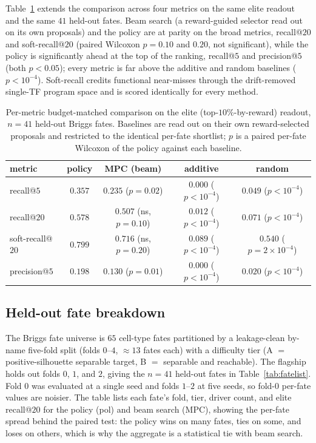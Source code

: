 Table~\ref{tab:elite_permetric} extends the comparison across four metrics on the same elite readout and the same
$41$ held-out fates. Beam search (a reward-guided selector read out on its own proposals) and the policy are at
parity on the broad metrics, recall@$20$ and soft-recall@$20$ (paired Wilcoxon $p{=}0.10$ and $0.20$, not
significant), while the policy is significantly ahead at the top of the ranking, recall@$5$ and precision@$5$
(both $p<0.05$); every metric is far above the additive and random baselines ($p<10^{-4}$). Soft-recall credits
functional near-misses through the drift-removed single-TF program space and is scored identically for every
method.

\begin{table}[h]\centering\footnotesize
\caption{Per-metric budget-matched comparison on the elite (top-$10\%$-by-reward) readout, $n{=}41$ held-out
Briggs fates. Baselines are read out on their own reward-selected proposals and restricted to the identical
per-fate shortlist; $p$ is a paired per-fate Wilcoxon of the policy against each baseline.}
\label{tab:elite_permetric}
\begin{tabular}{@{}lcccc@{}}
\toprule
metric & policy & MPC (beam) & additive & random \\
\midrule
recall@$5$        & $0.357$ & $0.235$ ($p{=}0.02$)        & $0.000$ ($p{<}10^{-4}$) & $0.049$ ($p{<}10^{-4}$) \\
recall@$20$       & $0.578$ & $0.507$ (ns, $p{=}0.10$)    & $0.012$ ($p{<}10^{-4}$) & $0.071$ ($p{<}10^{-4}$) \\
soft-recall@$20$  & $0.799$ & $0.716$ (ns, $p{=}0.20$)    & $0.089$ ($p{<}10^{-4}$) & $0.540$ ($p{=}2{\times}10^{-4}$) \\
precision@$5$     & $0.198$ & $0.130$ ($p{=}0.01$)        & $0.000$ ($p{<}10^{-4}$) & $0.020$ ($p{<}10^{-4}$) \\
\bottomrule
\end{tabular}
\end{table}

\subsection{Held-out fate breakdown}\label{app:fatebreakdown}
The Briggs fate universe is $65$ cell-type fates partitioned by a leakage-clean by-name five-fold split (folds
$0$--$4$, $\approx13$ fates each) with a difficulty tier (A $=$ positive-silhouette separable target, B $=$
separable and reachable). The flagship holds out folds $0$, $1$, and $2$, giving the $n{=}41$ held-out fates in
Table~\ref{tab:fatelist}. Fold $0$ was evaluated at a single seed and folds $1$--$2$ at five seeds, so fold-$0$
per-fate values are noisier. The table lists each fate's fold, tier, driver count, and elite recall@$20$ for the
policy (pol) and beam search (MPC), showing the per-fate spread behind the paired test: the policy wins on many
fates, ties on some, and loses on others, which is why the aggregate is a statistical tie with beam search.

